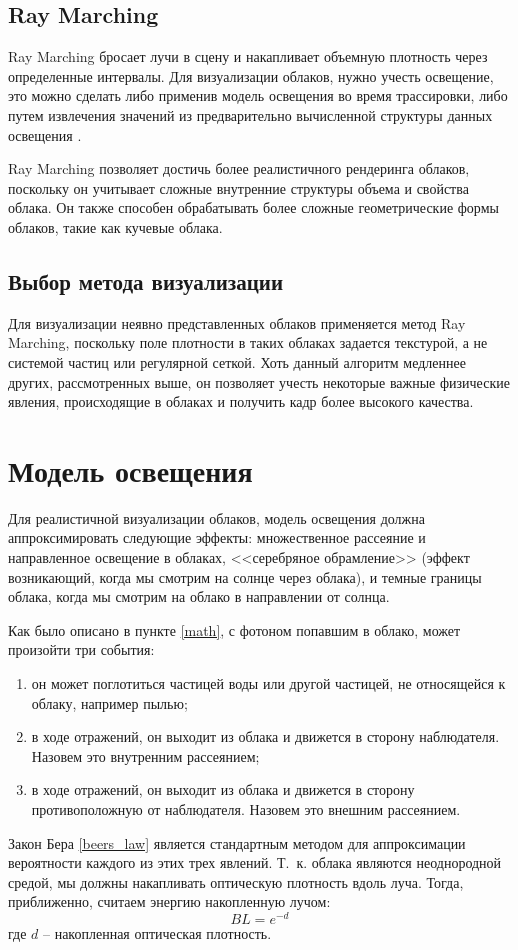 \subsection{Ray Marching}
\label{ray}
Ray Marching бросает лучи в сцену и накапливает объемную плотность через определенные интервалы. Для визуализации облаков, нужно учесть освещение, это можно сделать либо применив модель освещения во время трассировки, либо путем извлечения значений из предварительно вычисленной структуры данных освещения \cite{hzd, frostbite, clouds}.

Ray Marching позволяет достичь более реалистичного рендеринга облаков, поскольку он учитывает сложные внутренние структуры объема и свойства облака. Он также способен обрабатывать более сложные геометрические формы облаков, такие как кучевые облака.

\subsection{Выбор метода визуализации}
Для визуализации неявно представленных облаков применяется метод Ray Marching, поскольку поле плотности в таких облаках задается текстурой, а не системой частиц или регулярной сеткой. Хоть данный алгоритм медленнее других, рассмотренных выше, он позволяет учесть некоторые важные физические явления, происходящие в облаках и получить кадр более высокого качества.


\section{Модель освещения}

Для реалистичной визуализации облаков, модель освещения должна аппроксимировать следующие эффекты: множественное рассеяние и направленное освещение в облаках, <<серебряное обрамление>> (эффект возникающий, когда мы смотрим на солнце через облака), и темные границы облака, когда мы смотрим на облако в направлении от солнца. 

Как было описано в пункте \ref{math}, с фотоном попавшим в облако, может произойти три события:
\begin{enumerate}
	\item он может поглотиться частицей воды или другой частицей, не относящейся к облаку, например пылью;
	\item в ходе отражений, он выходит из облака и движется в сторону наблюдателя. Назовем это внутренним рассеянием;
	\item в ходе отражений, он выходит из облака и движется в сторону противоположную от наблюдателя. Назовем это внешним рассеянием.
\end{enumerate}
Закон Бера \eqref{beers_law} является стандартным методом для аппроксимации вероятности каждого из этих трех явлений. Т.~к. облака являются неоднородной средой, мы должны накапливать оптическую плотность вдоль луча. Тогда, приближенно, считаем энергию накопленную лучом:
\begin{equation}
	\label{bl}
	BL = e ^ {-d}
\end{equation}
где $ d $ -- накопленная оптическая плотность.


